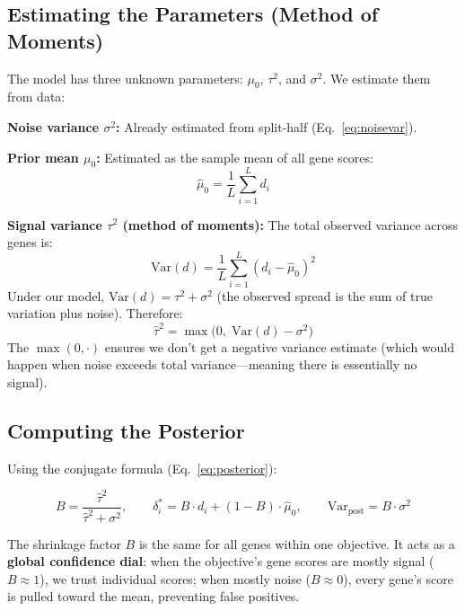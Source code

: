 \documentclass[11pt,letterpaper]{article}
\theoremstyle{definition}
\begin{document}
\subsection{Estimating the Parameters (Method of Moments)}

The model has three unknown parameters: $\mu_0$, $\tau^2$, and $\sigma^2$. We estimate them from data:

\textbf{Noise variance $\sigma^2$:} Already estimated from split-half (Eq.~\ref{eq:noisevar}).

\textbf{Prior mean $\mu_0$:} Estimated as the sample mean of all gene scores:
\[
\hat{\mu}_0 = \frac{1}{L} \sum_{i=1}^L d_i
\]

\textbf{Signal variance $\tau^2$ (method of moments):} The total observed variance across genes is:
\[
\text{Var}(d) = \frac{1}{L} \sum_{i=1}^L (d_i - \hat{\mu}_0)^2
\]
Under our model, $\text{Var}(d) = \tau^2 + \sigma^2$ (the observed spread is the sum of true variation plus noise). Therefore:
\begin{equation}
\hat{\tau}^2 = \max\!\bigl(0, \;\text{Var}(d) - \sigma^2\bigr)
\label{eq:tau2}
\end{equation}
The $\max(0, \cdot)$ ensures we don't get a negative variance estimate (which would happen when noise exceeds total variance---meaning there is essentially no signal).

\subsection{Computing the Posterior}

Using the conjugate formula (Eq.~\ref{eq:posterior}):

\begin{equation}
\boxed{B = \frac{\hat{\tau}^2}{\hat{\tau}^2 + \sigma^2}, \qquad \delta^*_i = B \cdot d_i + (1 - B) \cdot \hat{\mu}_0, \qquad \text{Var}_\text{post} = B \cdot \sigma^2}
\label{eq:molli_posterior}
\end{equation}

\begin{tcolorbox}[keybox]
The shrinkage factor $B$ is the same for all genes within one objective. It acts as a \textbf{global confidence dial}: when the objective's gene scores are mostly signal ($B \approx 1$), we trust individual scores; when mostly noise ($B \approx 0$), every gene's score is pulled toward the mean, preventing false positives.
\end{tcolorbox}
\end{document}
